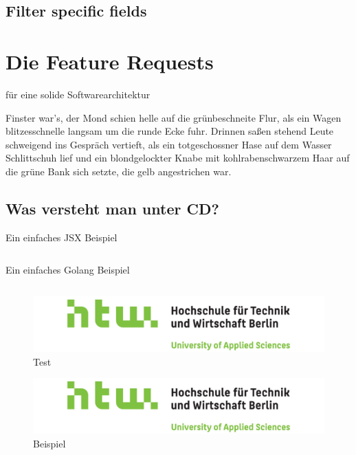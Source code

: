 \section{Filter specific fields}

\chapter{Die Feature Requests}

für eine solide Softwarearchitektur

Finster war's, der Mond schien helle auf die grünbeschneite Flur, als
ein Wagen blitzesschnelle langsam um die runde Ecke fuhr. Drinnen
saßen stehend Leute schweigend ins Gespräch vertieft, als ein
totgeschossner Hase auf dem Wasser Schlittschuh lief und ein
blondgelockter Knabe mit kohlrabenschwarzem Haar auf die grüne Bank
sich setzte, die gelb angestrichen war.

\section{Was versteht man unter CD?}
\label{sec:was-versteht-man-unter-cd}


\begin{listing}
    \label{lst:HelloJSX}
    \caption{Ein einfaches JSX Beispiel}
    \inputminted{jsx}{snippets/examples/Welcome.jsx}
\end{listing}

\begin{listing}
    \label{lst:Golang}
    \caption{Ein einfaches Golang Beispiel}
    \inputminted{go}{snippets/examples/hello.go}
\end{listing}

\newpage

\begin{figure}
    \label{figure:test}
    \includegraphics[scale=0.2]{img/HTW}
    \caption{Test}
\end{figure}

\begin{figure}
    \label{figure:beispiel}
    \includegraphics[scale=0.2]{img/HTW}
    \caption{Beispiel}
\end{figure}

